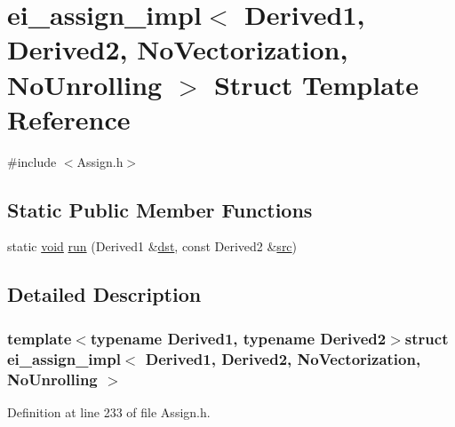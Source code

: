 \hypertarget{structei__assign__impl_3_01_derived1_00_01_derived2_00_01_no_vectorization_00_01_no_unrolling_01_4}{\section{ei\-\_\-assign\-\_\-impl$<$ Derived1, Derived2, No\-Vectorization, No\-Unrolling $>$ Struct Template Reference}
\label{structei__assign__impl_3_01_derived1_00_01_derived2_00_01_no_vectorization_00_01_no_unrolling_01_4}
}


{\ttfamily \#include $<$Assign.\-h$>$}

\subsection*{Static Public Member Functions}
\begin{DoxyCompactItemize}
\item 
static \hyperlink{group___u_a_v_objects_plugin_ga444cf2ff3f0ecbe028adce838d373f5c}{void} \hyperlink{structei__assign__impl_3_01_derived1_00_01_derived2_00_01_no_vectorization_00_01_no_unrolling_01_4_a539ea81fd00208160a7950809d4066e7}{run} (Derived1 \&\hyperlink{glext_8h_a92034251bfd455d524a9b5610cddba00}{dst}, const Derived2 \&\hyperlink{glext_8h_a72e0fdf0f845ded60b1fada9e9195cd7}{src})
\end{DoxyCompactItemize}


\subsection{Detailed Description}
\subsubsection*{template$<$typename Derived1, typename Derived2$>$struct ei\-\_\-assign\-\_\-impl$<$ Derived1, Derived2, No\-Vectorization, No\-Unrolling $>$}



Definition at line 233 of file Assign.\-h.




